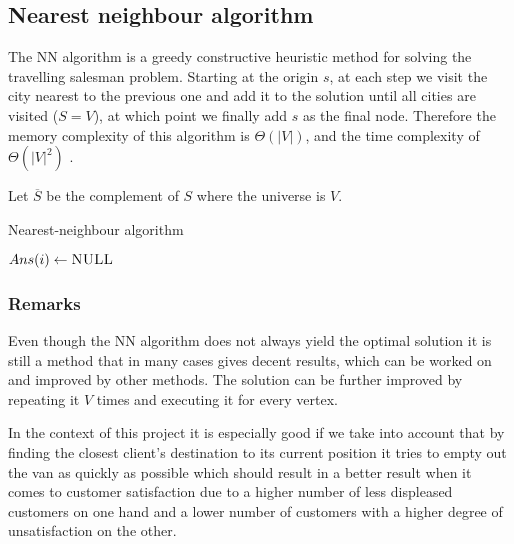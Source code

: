 \subsection{Nearest neighbour algorithm} \label{algorithm-tsp-nn}
The \acrfull*{NN} algorithm is a \gls{greedy} \gls{constructive} heuristic method for solving the travelling salesman problem.
Starting at the origin $s$, at each step we visit the city nearest to the previous one and add it to the solution until all cities are visited ($S = V$), at which point we finally add $s$ as the final node.
Therefore the memory complexity of this algorithm is $\Theta (|V|)$, and the time complexity of $\Theta (|V|^{2})$ \cite{reinelt}.\par
Let $\overline{S}$ be the complement of $S$ where the universe is $V$.
\begin{algorithm}[h]
    \caption{Nearest-neighbour algorithm}
    \label{alg:nearest neighbour}
    \begin{algorithmic}[1]
             {$Ans(i) \gets \textsc{NULL}$}
            \EndFor
            \EndFor
            \State {}
        \EndFunction
    \end{algorithmic}
\end{algorithm}
\subsubsection{Remarks}
Even though the \acrlong*{NN} algorithm does not always yield the optimal solution it is still a method that in many cases gives decent results, which can be worked on and improved by other methods.
The solution can be further improved by repeating it $V$ times and executing it for every vertex.\par
In the context of this project it is especially good if we take into account that by finding the closest client's destination to its current position it tries to empty out the van as quickly as possible
which should result in a better result when it comes to customer satisfaction due to a higher number of less displeased customers on one hand and a lower number of customers with a higher degree of unsatisfaction on the other.
\\
